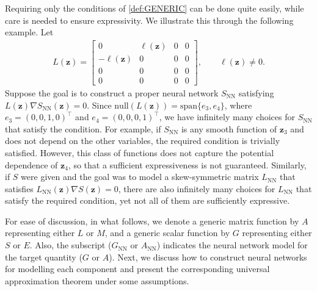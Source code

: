 \documentclass[openacc]{rsproca_new}%
\newcommand{\z}{\bm{z}}
\begin{document}
Requiring only the conditions of \eqref{def:GENERIC} can be done quite easily,
while care is needed to ensure expressivity.
We illustrate this through the following example. 
Let 
\begin{align*}
    L(\z) = \begin{bmatrix} 0 & \ell(\z) & 0 & 0 \\ -\ell(\z) & 0 & 0 & 0\\ 0 & 0 & 0 & 0 \\ 0 & 0 & 0 & 0 \end{bmatrix},
    \qquad
    \ell(\z) \ne 0.
\end{align*}
Suppose the goal is to construct a proper neural network $S_{\text{NN}}$ satisfying $L(\z)\nabla S_{\text{NN}}(\z) = 0$.
Since $\text{null}(L(\z)) =  \text{span}\{e_3, e_4\}$, 
where $e_3 = (0, 0, 1,0)^\top$ and $e_4 = (0,0,0,1)^\top$, 
we have infinitely many choices for $S_{\text{NN}}$ that satisfy the condition.
For example, if $S_{\text{NN}}$ is any smooth function of $\z_3$ and does not depend on the other variables, 
the required condition is trivially satisfied. 
However, this class of functions does not capture the potential dependence of $\z_4$,
so that a sufficient expressiveness is not guaranteed. 
Similarly, if $S$ were given and the goal was to 
model a skew-symmetric matrix $L_{\text{NN}}$ that satisfies $L_{\text{NN}}(\z)\nabla S(\z) = 0$,
there are also infinitely many choices for $L_{\text{NN}}$ that satisfy the required condition, 
yet not all of them are sufficiently expressive.




For ease of discussion, in what follows, 
we denote a generic matrix function by $A$ 
representing either $L$ or $M$,
and a generic scalar function by $G$ representing either 
$S$ or $E$.
Also, the subscript ($G_{\text{NN}}$ or $A_{\text{NN}}$)
indicates the neural network model for the target quantity ($G$ or $A$).
Next, we discuss how to construct neural networks for 
modelling each component and present 
the corresponding universal approximation theorem 
under some assumptions. 
\end{document}
